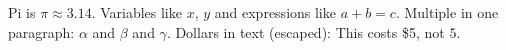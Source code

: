 \documentclass{article}
\begin{document}
Pi is $\pi \approx 3.14$. Variables like $x$, $y$ and expressions like $a+b=c$.
Multiple in one paragraph: $\alpha$ and $\beta$ and $\gamma$.
Dollars in text (escaped): This costs \$5, not $5$.
\end{document}

